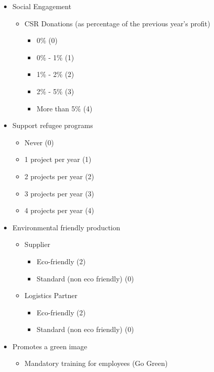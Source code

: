 \begin{itemize}
    \item Social Engagement
    \begin{itemize}
        \item CSR Donations (as percentage of the previous year's profit)
            \begin{itemize}
                \item 0\% (0)
                \item 0\% - 1\% (1)
                \item 1\% - 2\% (2)
                \item 2\% - 5\% (3)
                \item More than 5\% (4)
            \end{itemize}
    \end{itemize}
    \item Support refugee programs
    \begin{itemize}
        \item Never (0)
        \item 1 project per year (1)
        \item 2 projects per year (2)
        \item 3 projects per year (3)
        \item 4 projects per year (4)
    \end{itemize}
    \item Environmental friendly production
    \begin{itemize}
        \item Supplier
            \begin{itemize}
                \item Eco-friendly (2)
                \item Standard (non eco friendly) (0)
            \end{itemize}
        \item Logistics Partner
            \begin{itemize}
                \item Eco-friendly (2)
                \item Standard (non eco friendly) (0)
            \end{itemize}    
    \end{itemize}
    \item Promotes a green image
    \begin{itemize}
       \item Mandatory training for employees (Go Green)

\end{itemize}
\end{itemize}
